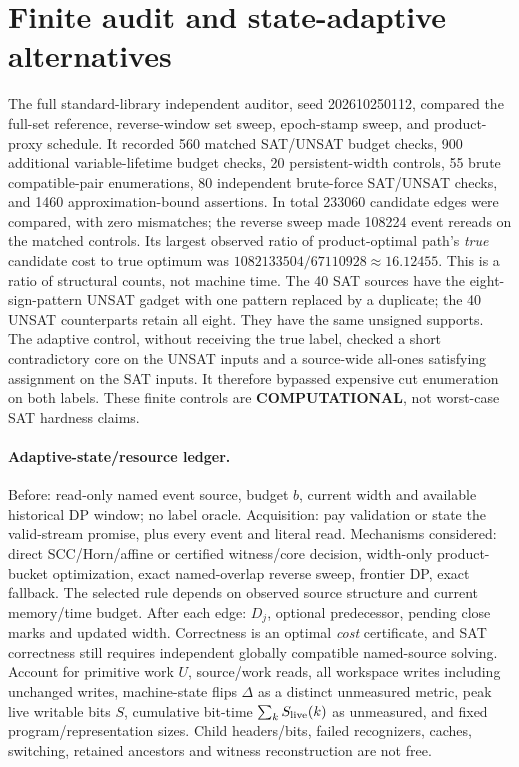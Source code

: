 \documentclass[11pt]{article}
\begin{document}
\section{Finite audit and state-adaptive alternatives}
The full standard-library independent auditor, seed 202610250112, compared the full-set reference, reverse-window set sweep, epoch-stamp sweep, and product-proxy schedule. It recorded 560 matched SAT/UNSAT budget checks, 900 additional variable-lifetime budget checks, 20 persistent-width controls, 55 brute compatible-pair enumerations, 80 independent brute-force SAT/UNSAT checks, and 1460 approximation-bound assertions. In total 233060 candidate edges were compared, with zero mismatches; the reverse sweep made 108224 event rereads on the matched controls. Its largest observed ratio of product-optimal path's \emph{true} candidate cost to true optimum was
$1082133504/67110928\approx16.12455$. This is a ratio of structural counts, not machine time.
The 40 SAT sources have the eight-sign-pattern UNSAT gadget with one pattern replaced by a duplicate; the 40 UNSAT counterparts retain all eight. They have the same unsigned supports. The adaptive control, without receiving the true label, checked a short contradictory core on the UNSAT inputs and a source-wide all-ones satisfying assignment on the SAT inputs. It therefore bypassed expensive cut enumeration on both labels. These finite controls are \textbf{COMPUTATIONAL}, not worst-case SAT hardness claims.

\paragraph{Adaptive-state/resource ledger.}
Before: read-only named event source, budget $b$, current width and available historical DP window; no label oracle. Acquisition: pay validation or state the valid-stream promise, plus every event and literal read. Mechanisms considered: direct SCC/Horn/affine or certified witness/core decision, width-only product-bucket optimization, exact named-overlap reverse sweep, frontier DP, exact fallback. The selected rule depends on observed source structure and current memory/time budget. After each edge: $D_j$, optional predecessor, pending close marks and updated width. Correctness is an optimal \emph{cost} certificate, and SAT correctness still requires independent globally compatible named-source solving. Account for primitive work $U$, source/work reads, all workspace writes including unchanged writes, machine-state flips $\Delta$ as a distinct unmeasured metric, peak live writable bits $S$, cumulative bit-time $\sum_k S_{\rm live}(k)$ as unmeasured, and fixed program/representation sizes. Child headers/bits, failed recognizers, caches, switching, retained ancestors and witness reconstruction are not free.
\end{document}
